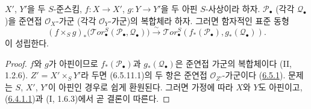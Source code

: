 \begin{proposition}[6.5.11]
\label{III.6.5.11-fr}
$X'$, $Y'$을 두 $S$-준스킴, $f:X\to X'$, $g:Y\to Y'$을 두 아핀
$S$-사상이라 하자. $\mathscr P_\bullet$ (각각
$\mathscr Q_\bullet$)을 준연접 $\mathscr O_X$-가군 (각각
$\mathscr O_Y$-가군)의 복합체라 하자. 그러면 함자적인 표준 동형
\[
  (f\times_S g)_*
  \bigl(\mathscr{T}\!or_\bullet^S
    (\mathscr P_\bullet,\mathscr Q_\bullet)\bigr)
  \xrightarrow{\sim}
  \mathscr{T}\!or_\bullet^S
  (f_*(\mathscr P_\bullet),g_*(\mathscr Q_\bullet)).
  \tag{6.5.11.1}\label{III.6.5.11.1.fr}
\]
이 성립한다.
\end{proposition}

\begin{proof}
$f$와 $g$가 아핀이므로 $f_*(\mathscr P_\bullet)$과
$g_*(\mathscr Q_\bullet)$은 준연접 가군의 복합체이다 (II, 1.2.6).
$Z'=X'\times_S Y'$라 두면 (6.5.11.1)의 두 항은 준연접
$\mathscr O_{Z'}$-가군이다 (\hyperref[III.6.5.1-fr]{6.5.1}). 문제는
$S$, $X'$, $Y'$이 아핀인 경우로 쉽게 환원된다. 그러면 가정에 따라
$X$와 $Y$도 아핀이고,
(\hyperref[III.6.4.1.1.fr]{6.4.1.1})과 (I, 1.6.3)에서 곧 결론이
따른다.
\end{proof}

